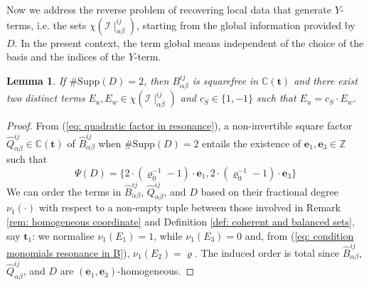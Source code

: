 \documentclass[10pt]{article}
\newtheorem{lem}{Lemma}%
\theoremstyle{remark}%
\theoremstyle{definition}%
\begin{document}
Now we address the reverse problem of recovering local data that generate $Y$-terms, i.e. the sets $\chi(\mathcal{I}\mid_{\alpha\beta}^{ij})$, starting from the global information provided by $D$. In the present context, the term global means independent of the choice of the basis and the indices of the $Y$-term. 
%
\begin{lem}
\label{lem: binomial D} If $\#\mathrm{Supp}(D)=2$, then $B_{\alpha\beta}^{ij}$ is squarefree in $\mathbb{C}(\mathbf{t})$ and there exist two distinct terms $E_{u},E_{w}\in\chi(\mathcal{I}\mid_{\alpha\beta}^{ij})$ and $c_{S}\in\{1,-1\}$ such that $E_{u}=c_{S}\cdot E_{w}$.
\end{lem}
\begin{proof}
From (\ref{eq: quadratic factor in resonance}), a non-invertible square factor $\hat{Q}_{\alpha\beta}^{ij}\in\mathbb{C}(\mathbf{t})$ of $\hat{B}_{\alpha\beta}^{ij}$ when $\#\mathrm{Supp}(D)=2$ entails the existence of $\mathbf{e}_{1},\mathbf{e}_{3}\in\mathbb{Z}$ such that 
 \begin{equation}
\Psi(D)=\{2\cdot(\varrho_{0}^{-1}-1)\cdot\mathbf{e}_{1},2\cdot(\varrho_{0}^{-1}-1)\cdot\mathbf{e}_{3}\}\label{eq: D when binomial D}
 \end{equation}
We can order the terms in $\hat{B}_{\alpha\beta}^{ij}$, $\hat{Q}_{\alpha\beta}^{ij}$, and $D$ based on their fractional degree $\nu_{1}(\cdot)$ with respect to a non-empty tuple between those involved in Remark \ref{rem: homogeneous coordinate} and Definition \ref{def: coherent and balanced sets}, say $\mathbf{t}_{1}$: we normalise $\nu_{1}(E_{1})=1$, while $\nu_{1}(E_{3})=0$ and, from (\ref{eq: condition monomials resonance in B}), $\nu_{1}(E_{2})=\varrho$. The induced order is total since $\hat{B}_{\alpha\beta}^{ij}$, $\hat{Q}_{\alpha\beta}^{ij}$, and $D$ are $(\mathbf{e}_{1},\mathbf{e}_{3})$-homogeneous.


\end{proof}
\end{document}

